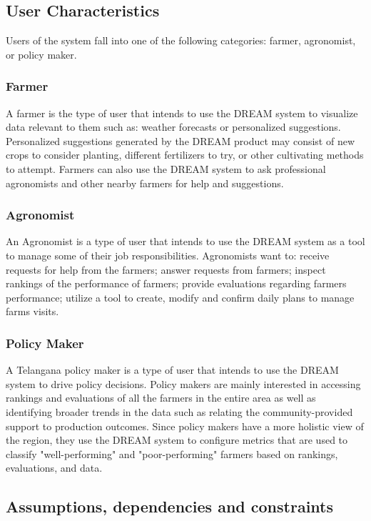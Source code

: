 \subsection{User Characteristics}
\begin{flushleft}
Users of the system fall into one of the following categories: farmer, agronomist, or policy maker.
\subsubsection{Farmer}
A farmer is the type of user that intends to use the DREAM system to visualize data relevant to them such as: weather forecasts or personalized suggestions. Personalized suggestions generated by the DREAM product may consist of new crops to consider planting, different fertilizers to try, or other cultivating methods to attempt. Farmers can also use the DREAM system to ask professional agronomists and other nearby farmers for help and suggestions.\\
\subsubsection{Agronomist}
An Agronomist is a type of user that intends to use the DREAM system as a tool to manage some of their job responsibilities. Agronomists want to: receive requests for help from the farmers; answer requests from farmers; inspect rankings of the performance of farmers; provide evaluations regarding farmers performance; utilize a tool to create, modify and confirm daily plans to manage farms visits.
\subsubsection{Policy Maker}
A Telangana policy maker is a type of user that intends to use the DREAM system to drive policy decisions. Policy makers are mainly interested in accessing rankings and evaluations of all the farmers in the entire area as well as identifying broader trends in the data such as relating the community-provided support to production outcomes. Since policy makers have a more holistic view of the region, they use the DREAM system to configure metrics that are used to classify "well-performing" and "poor-performing" farmers based on rankings, evaluations, and data.\\
\end{flushleft}

\subsection{Assumptions, dependencies and constraints}
